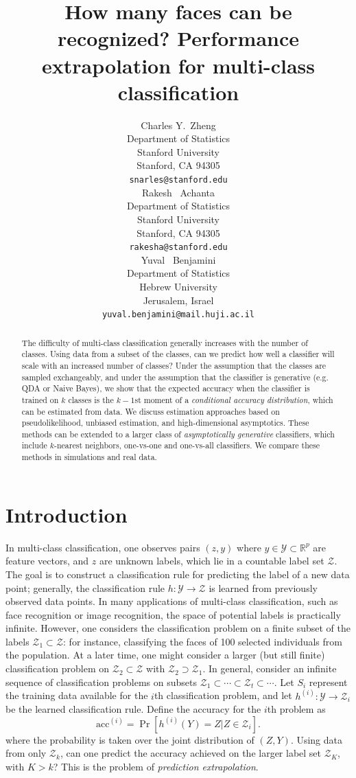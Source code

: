 \documentclass{article}
\title{How many faces can be recognized? Performance extrapolation for
  multi-class classification}
\author{
  Charles Y.~Zheng \\
  Department of Statistics\\
  Stanford University\\
  Stanford, CA 94305 \\
  \texttt{snarles@stanford.edu} \\
  \And
  Rakesh ~Achanta \\
  Department of Statistics\\
  Stanford University\\
  Stanford, CA 94305 \\
  \texttt{rakesha@stanford.edu} \\
  \And
  Yuval ~Benjamini \\
  Department of Statistics \\
  Hebrew University\\
  Jerusalem, Israel\\
  \texttt{yuval.benjamini@mail.huji.ac.il}
}
\begin{document}

\maketitle

\begin{abstract}
The difficulty of multi-class classification generally increases with
the number of classes.  Using data from a subset of the classes, 
can we predict how well a classifier will scale with an
increased number of classes?  Under the assumption that the classes
are sampled exchangeably, and under the assumption that
the classifier is generative (e.g. QDA or Naive Bayes), we show that the expected accuracy
when the classifier is trained on $k$ classes is the $k-1$st moment
of a \emph{conditional accuracy distribution}, which can be estimated from data.
We discuss estimation approaches based on pseudolikelihood, 
unbiased estimation, and high-dimensional asymptotics.
These methods can be extended to a larger class of \emph{asymptotically generative} classifiers,
which include $k$-nearest neighbors, one-vs-one and
one-vs-all classifiers.
We compare these methods in simulations and real data.
\end{abstract}

\section{Introduction}

In multi-class classification, one observes pairs $(z, y)$ where $y \in \mathcal{Y} \subset \mathbb{R}^p$ are feature vectors,
and $z$ are unknown labels, which lie in a countable label set $\mathcal{Z}$.  The goal is to construct a classification rule for
predicting the label of a new data point; generally, the classification rule $h: \mathcal{Y} \to \mathcal{Z}$
is learned from previously observed data points.  In many applications of multi-class classification,
such as face recognition or image recognition, the space of potential labels is practically infinite.
However, one considers the classification problem on a finite subset of the labels $\mathcal{Z}_1 \subset \mathcal{Z}$:
for instance, classifying the faces of 100 selected individuals from the population.
At a later time, one might consider a larger (but still finite) classification problem on $\mathcal{Z}_2 \subset \mathcal{Z}$
with $\mathcal{Z}_2 \supset \mathcal{Z}_1$.
In general, consider an infinite sequence of classification problems on subsets $\mathcal{Z}_1 \subset \cdots \subset \mathcal{Z}_t \subset \cdots$.  
Let $S_i$ represent the training data available for the $i$th classification problem,
and let $h^{(i)}: \mathcal{Y} \to \mathcal{Z}_i$ be the learned classification rule.
Define the accuracy for the $i$th problem as
\[
\text{acc}^{(i)} = \Pr[h^{(i)}(Y) = Z|Z \in \mathcal{Z}_i].
\]
where the probability is taken over the joint distribution of $(Z, Y)$.
Using data from only $\mathcal{Z}_k$, can one predict the accuracy achieved on the larger label set $\mathcal{Z}_K$, with $K> k$?  This is the problem of \emph{prediction extrapolation}.
\end{document}
